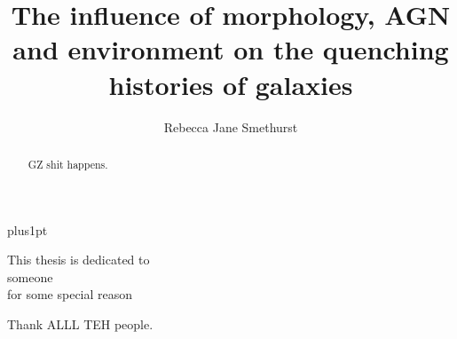 \documentclass[12pt,useAMS]{ociamthesis}  %
\title{The influence of morphology, AGN and environment     %
        on the quenching histories of galaxies}   %
\author{Rebecca Jane Smethurst}             %
\begin{document}
\baselineskip=18pt plus1pt

\setcounter{secnumdepth}{3}
\setcounter{tocdepth}{3}


\maketitle                  %

\begin{dedication}
This thesis is dedicated to\\
 someone\\
for some special reason\\
\end{dedication}

\begin{acknowledgements}
Thank ALLL TEH people. 
\end{acknowledgements}

\begin{abstract}  
GZ shit happens.         %
\end{abstract}

\begin{romanpages}          %
\tableofcontents            %
\listoffigures              %
\end{romanpages}            %











\end{document}
